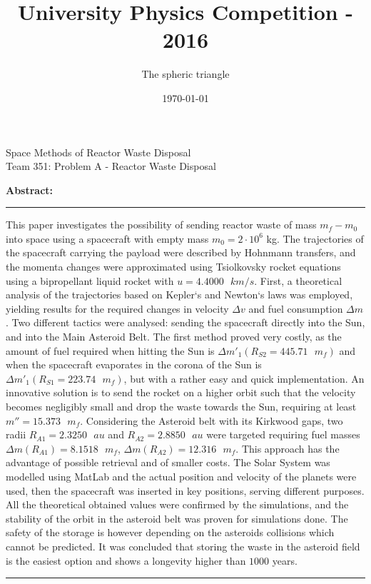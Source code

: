 \documentclass[onecolumn,12pt]{article}
\title{University Physics Competition - 2016}
\author{The spheric triangle}
\date{\today}
\numberwithin{equation}{section}
\renewenvironment{abstract}{
\begin{center}
\begin{minipage}{0.85\textwidth}
\rule{\textwidth}{0pt}}
{\par\noindent\rule{\textwidth}{0pt}
\end{minipage} \end{center}}
\begin{document}
\begin{titlepage}
\begin{center}
\vspace{5mm}
\huge{Space Methods of Reactor Waste Disposal} \\
\vspace{5mm}
\Large{Team 351: Problem A - Reactor Waste Disposal} \\
\vspace{5mm}


\textbf{Abstract:}\\
\vspace{5mm}
\end{center}

\begin{abstract}

This paper investigates the possibility of sending reactor waste of mass $m_f - m_0$ into space using a spacecraft with empty mass $m_0 = 2 \cdot 10^6$ kg. The trajectories of the spacecraft carrying the payload were described by Hohnmann transfers, and the momenta changes were approximated using Tsiolkovsky rocket equations using a bipropellant liquid rocket with $u = 4.4000 \text{ }km/s$. First, a theoretical analysis of the trajectories based on Kepler`s and Newton`s laws was employed, yielding results for the required changes in velocity $\Delta v$ and fuel consumption $\Delta m$. Two different tactics were analysed: sending the spacecraft directly into the Sun, and into the Main Asteroid Belt. The first method proved very costly, as the amount of fuel required when hitting the Sun is $ \Delta m'_1(R_{S2} = 445.71 \text{ }m_f)$ and when the spacecraft evaporates in the corona of the Sun is $ \Delta m'_1(R_{S1} = 223.74 \text{ }m_f)$, but with a rather easy and quick implementation. An innovative solution is to send the rocket on a higher orbit such that the velocity becomes negligibly small and drop the waste towards the Sun, requiring at least $m'' = 15.373  \text{ }m_f$. Considering the Asteroid belt with its Kirkwood gaps, two radii $R_{A1} = 2.3250 \text{ }au$ and $R_{A2} = 2.8850 \text{ }au$ were targeted requiring fuel masses $\Delta m (R_{A1}) = 8.1518 \text{ }m_f$, $\Delta m (R_{A2}) = 12.316 \text{ }m_f$. This approach has the advantage of possible retrieval and of smaller costs. The Solar System was modelled using MatLab and the actual position and velocity of the planets were used, then the spacecraft was inserted in key positions, serving different purposes. All the theoretical obtained values were confirmed by the simulations, and the stability of the orbit in the asteroid belt was proven for simulations done. The safety of the storage is however depending on the asteroids collisions which cannot be predicted. It was concluded that storing the waste in the asteroid field is the easiest option and shows a longevity higher than $1000$ years.

\end{abstract}
\end{titlepage}
\newpage
\end{document}
